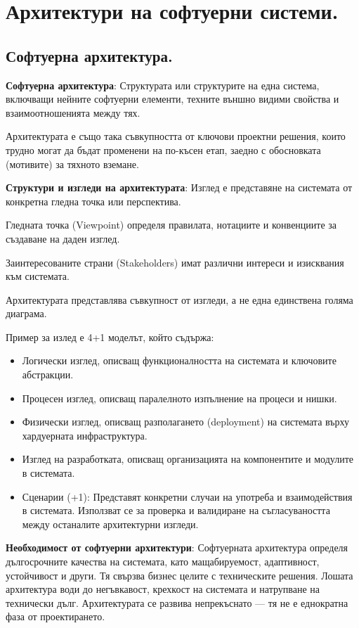 \documentclass{article}
\renewcommand{\\}{\newline}
\begin{document}
\newpage
\section{Архитектури на софтуерни системи.}

\subsection{Софтуерна архитектура.}

\textbf{Софтуерна архитектура}: Структурата или структурите на една система, включващи нейните софтуерни елементи, техните външно видими свойства и взаимоотношенията между тях.

Архитектурата е също така съвкупността от ключови проектни решения, които трудно могат да бъдат променени на по-късен етап, заедно с обосновката (мотивите) за тяхното вземане.

\textbf{Структури и изгледи на архитектурата}: Изглед е представяне на системата от конкретна гледна точка или перспектива.

Гледната точка (Viewpoint) определя правилата, нотациите и конвенциите за създаване на даден изглед.

Заинтересованите страни (Stakeholders) имат различни интереси и изисквания към системата. 

Архитектурата представлява съвкупност от изгледи, а не една единствена голяма диаграма.

Пример за излед е 4+1 моделът, който съдържа: 
\begin{itemize}
    \item Логически изглед, описващ функционалността на системата и ключовите абстракции.
    \item Процесен изглед, описващ паралелното изпълнение на процеси и нишки.
    \item Физически изглед, описващ разполагането (deployment) на системата върху хардуерната инфраструктура.
    \item Изглед на разработката, описващ организацията на компонентите и модулите в системата.
    \item Сценарии (+1): Представят конкретни случаи на употреба и взаимодействия в системата. Използват се за проверка и валидиране на съгласуваността между останалите архитектурни изгледи.
\end{itemize}

\textbf{Необходимост от софтуерни архитектури}: Софтуерната архитектура определя дългосрочните качества на системата, като мащабируемост, адаптивност, устойчивост и други. Тя свързва бизнес целите с техническите решения. Лошата архитектура води до негъвкавост, крехкост на системата и натрупване на технически дълг. Архитектурата се развива непрекъснато — тя не е еднократна фаза от проектирането. 
\end{document}
